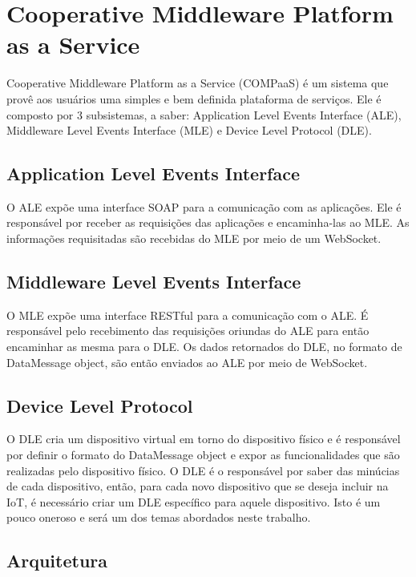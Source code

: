 \section{Cooperative Middleware Platform as a Service}
\label{sec:COMPaaS}
Cooperative Middleware Platform as a Service (COMPaaS) é um sistema que provê aos usuários uma simples e bem
definida plataforma de serviços. Ele é composto por 3 subsistemas, a saber:  Application Level Events
Interface (ALE), Middleware Level Events Interface (MLE) e Device Level Protocol (DLE).

\subsection{Application Level Events Interface}
O ALE expõe uma interface SOAP para a comunicação com as aplicações. Ele é responsável por receber as requisições
das aplicações e encaminha-las ao MLE. As informações requisitadas são recebidas do MLE por meio de um WebSocket.

\subsection{Middleware Level Events Interface}
O MLE expõe uma interface RESTful para a comunicação com o ALE. É responsável pelo recebimento das requisições
oriundas do ALE para então encaminhar as mesma para o DLE. Os dados retornados do DLE, no formato de DataMessage
object, são então enviados ao ALE por meio de WebSocket.

\subsection{Device Level Protocol}
O DLE cria um dispositivo virtual em torno do dispositivo físico e é responsável por definir o formato do DataMessage
object e expor as funcionalidades que são realizadas pelo dispositivo físico. O DLE é o responsável por saber das
minúcias de cada dispositivo, então, para cada novo dispositivo que se deseja incluir na IoT, é necessário criar
um DLE específico para aquele dispositivo. Isto é um pouco oneroso e será um dos temas abordados neste trabalho.

\subsection{Arquitetura}
